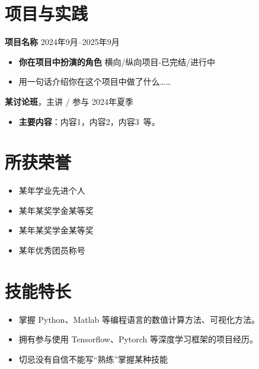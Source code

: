 \documentclass[11pt]{article}
\newlength{\iconwidth}
\begin{document}
    \begin{minipage}[t]{\textwidth}
    \section[项目与实践]{\makebox[\iconwidth][c]{\color{primary_color}{\faChalkboardTeacher}}\quad 项目与实践}
    
    {\large \textbf{项目名称}} \hfill 2024年9月--2025年9月
    \begin{itemize}
        \item \textbf{你在项目中扮演的角色} \hfill 横向/纵向项目-已完结/进行中
        \item 用一句话介绍你在这个项目中做了什么\dots\dots
    \end{itemize}

    \vspace{0.5em}
    {\large \textbf{某讨论班}}，主讲 / 参与 \hfill 2024年夏季
    \begin{itemize}
        \item \textbf{主要内容}：内容1，内容2，内容3\ 等。
    \end{itemize}

    
    \vspace{1.2em}
    \end{minipage}
    \begin{minipage}[t]{\textwidth}    
    \section{\makebox[\widthof{\faStar}][c]{\color{primary_color}{\faStar}}\quad 所获荣誉}
        \begin{itemize}
            \item 某年学业先进个人
            \item 某年某奖学金某等奖
            \item 某年某奖学金某等奖
            \item 某年优秀团员称号
        \end{itemize}
    \end{minipage}
    
  \vspace{1em}
    \begin{minipage}[t]{\textwidth}
        \section[技能特长]{\makebox[\iconwidth][c]{\color{primary_color}{\faWrench}}\quad 技能特长}
        \begin{itemize}
        \setlength{\itemsep}{0.5em}
            \item 掌握 Python、Matlab 等编程语言的数值计算方法、可视化方法。
            \item 拥有参与使用 Tensorflow、Pytorch 等深度学习框架的项目经历。
            \item 切忌没有自信不能写“熟练”掌握某种技能
        \end{itemize}
    \end{minipage}
    \vspace{0.5em}
  
\end{document}
